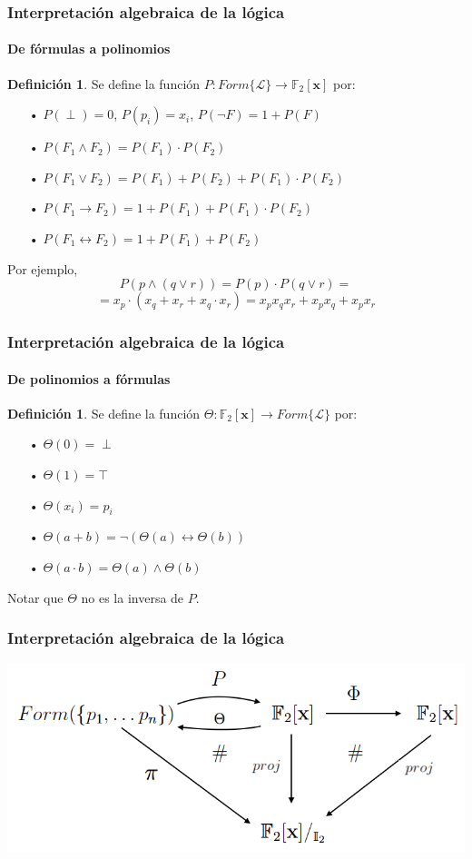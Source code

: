 \documentclass[12pt,a4paper]{beamer}
\theoremstyle{definition}
\newtheorem{defn}[thm]{Definición}
\theoremstyle{remark}
\begin{document}
\begin{frame}
\frametitle{Interpretación algebraica de la lógica}
\framesubtitle{De fórmulas a polinomios}
\begin{defn}
Se define la función $P: Form\{\mathcal{L}\} \rightarrow \mathbb{F}_2[\textbf{x}]$ por:
\begin{itemize}
\item[•] $P(\perp)=0$, $P(p_i)=x_i$, $P(\neg F)=1+P(F)$
\item[•] $P(F_1 \wedge F_2) = P(F_1) \cdot P(F_2)$
\item[•] $P(F_1 \vee F_2) = P(F_1) + P(F_2) + P(F_1) \cdot P(F_2)$
\item[•] $P(F_1 \rightarrow F_2) = 1 + P(F_1) + P(F_1) \cdot P(F_2)$
\item[•] $P(F_1 \leftrightarrow F_2) = 1 + P(F_1) + P(F_2)$
\end{itemize}
\end{defn}
Por ejemplo,
$$P(p \wedge (q \vee r)) = P(p) \cdot P(q \vee r) = $$
$$= x_p \cdot (x_q+x_r+x_q \cdot x_r) = x_px_qx_r+x_px_q+x_px_r$$
\end{frame}

\begin{frame}
\frametitle{Interpretación algebraica de la lógica}
\framesubtitle{De polinomios a fórmulas}
\begin{defn}
Se define la función $\Theta: \mathbb{F}_2[\textbf{x}] \rightarrow Form\{\mathcal{L}\}$ por:
\begin{itemize}
\item[•] $\Theta (0) = \perp$
\item[•] $\Theta (1) = \top$
\item[•] $\Theta (x_i) = p_i$
\item[•] $\Theta (a+b) = \neg(\Theta(a) \leftrightarrow \Theta(b))$
\item[•] $\Theta (a \cdot b) = \Theta(a) \wedge \Theta(b)$
\end{itemize}
\end{defn}
Notar que $\Theta$ no es la inversa de $P$.
\end{frame}

\begin{frame}
\frametitle{Interpretación algebraica de la lógica}
\vspace{1cm}
\begin{center}
\includegraphics[scale=0.35]{imagenes/conmu.png}
\end{center}
\end{frame}
\end{document}
